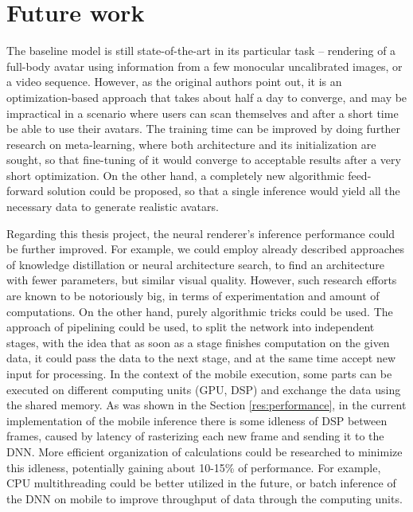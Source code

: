 \section{Future work}\label{res:future}

The baseline model \cite{dnn:stylepeople21} is still state-of-the-art in its particular task -- rendering of a full-body avatar using information from a few monocular uncalibrated images, or a video sequence. However, as the original authors point out, it is an optimization-based approach that takes about half a day to converge, and may be impractical in a scenario where users can scan themselves and after a short time be able to use their avatars. The training time can be improved by doing further research on meta-learning, where both architecture and its initialization are sought, so that fine-tuning of it would converge to acceptable results after a very short optimization. On the other hand, a completely new algorithmic feed-forward solution could be proposed, so that a single inference would yield all the necessary data to generate realistic avatars.

Regarding this thesis project, the neural renderer's inference performance could be further improved. For example, we could employ already described approaches of knowledge distillation or neural architecture search, to find an architecture with fewer parameters, but similar visual quality. However, such research efforts are known to be notoriously big, in terms of experimentation and amount of computations. On the other hand, purely algorithmic tricks could be used. The approach of pipelining \cite{mobile:pipelining20} could be used, to split the network into independent stages, with the idea that as soon as a stage finishes computation on the given data, it could pass the data to the next stage, and at the same time accept new input for processing. In the context of the mobile execution, some parts can be executed on different computing units (GPU, DSP) and exchange the data using the shared memory. As was shown in the Section \ref{res:performance}, in the current implementation of the mobile inference there is some idleness of DSP between frames, caused by latency of rasterizing each new frame and sending it to the DNN. More efficient organization of calculations could be researched to minimize this idleness, potentially gaining about 10-15\% of performance. For example, CPU multithreading could be better utilized in the future, or batch inference of the DNN on mobile to improve throughput of data through the computing units.

